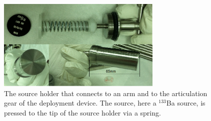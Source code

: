 \begin{figure}[htbp]
 \centering
  \includegraphics[width=0.7\textwidth]{Figures/SourceHolder.png}
  \caption{The source holder that connects to an arm and to the articulation gear of the deployment device. The source, here a $^{133}$Ba source, is pressed to the tip of the source holder via a spring.}
  \label{fig:SourceHolder}
\end{figure}